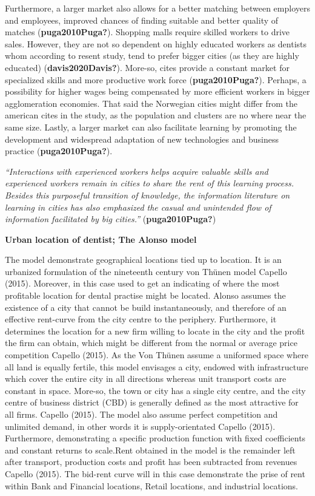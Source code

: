 \documentclass[
  10,
  a4paper,
]{article}
\begin{document}
Furthermore, a larger market also allows for a better matching between
employers and employees, improved chances of finding suitable and better
quality of matches (\textbf{puga2010Puga?}). Shopping malls require
skilled workers to drive sales. However, they are not so dependent on
highly educated workers as dentists whom according to resent study, tend
to prefer bigger cities (as they are highly educated)
(\textbf{davis2020Davis?}). More-so, cites provide a constant market for
specialized skills and more productive work force
(\textbf{puga2010Puga?}). Perhaps, a possibility for higher wages being
compensated by more efficient workers in bigger agglomeration economies.
That said the Norwegian cities might differ from the american cites in
the study, as the population and clusters are no where near the same
size. Lastly, a larger market can also facilitate learning by promoting
the development and widespread adaptation of new technologies and
business practice (\textbf{puga2010Puga?}).

\emph{``Interactions with experienced workers helps acquire valuable
skills and experienced workers remain in cities to share the rent of
this learning process. Besides this purposeful transition of knowledge,
the information literature on learning in cities has also emphasized the
casual and unintended flow of information facilitated by big cities.''}
(\textbf{puga2010Puga?})

\textbf{Urban location of dentist; The Alonso model}

The model demonstrate geographical locations tied up to location. It is
an urbanized formulation of the nineteenth century von Thünen model
Capello (2015). Moreover, in this case used to get an indicating of
where the most profitable location for dental practise might be located.
Alonso assumes the existence of a city that cannot be build
instantaneously, and therefore of an effective rent-curve from the city
centre to the periphery. Furthermore, it determines the location for a
new firm willing to locate in the city and the profit the firm can
obtain, which might be different from the normal or average price
competition Capello (2015). As the Von Thünen assume a uniformed space
where all land is equally fertile, this model envisages a city, endowed
with infrastructure which cover the entire city in all directions
whereas unit transport costs are constant in space. More-so, the town or
city has a single city centre, and the city centre of business district
(CBD) is generally defined as the most attractive for all firms. Capello
(2015). The model also assume perfect competition and unlimited demand,
in other words it is supply-orientated Capello (2015). Furthermore,
demonstrating a specific production function with fixed coefficients and
constant returns to scale.Rent obtained in the model is the remainder
left after transport, production costs and profit has been subtracted
from revenues Capello (2015). The bid-rent curve will in this case
demonstrate the prise of rent within Bank and Financial locations,
Retail locations, and industrial locations.
\end{document}
